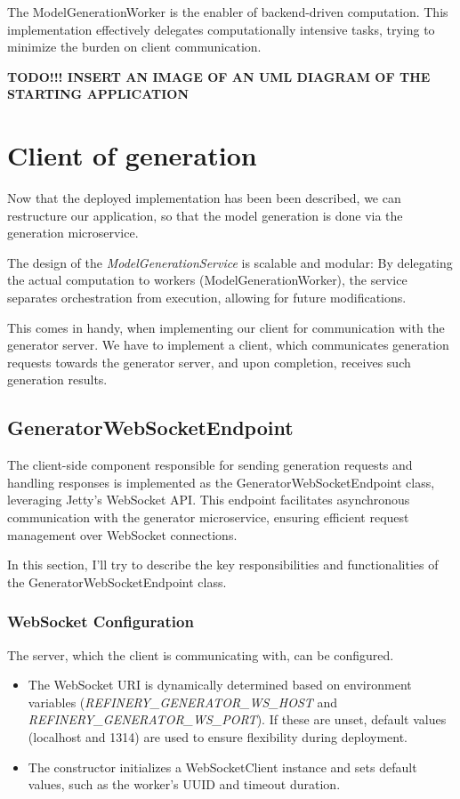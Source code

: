 			The ModelGenerationWorker is the enabler of backend-driven computation.
			This implementation effectively delegates computationally intensive tasks, trying to minimize 
			the burden on client communication.

		\textbf{TODO!!! INSERT AN IMAGE OF AN UML DIAGRAM OF THE STARTING APPLICATION}

	\section{Client of generation}
			Now that the deployed implementation has been been described, we can restructure our application, so that the 
			model generation is done via the generation microservice.

			The design of the \textit{ModelGenerationService} is scalable and modular:
			By delegating the actual computation to workers (ModelGenerationWorker), the service separates orchestration from execution, 
			allowing for future modifications. 
			
			This comes in handy, when implementing our client for communication with
			the generator server. We have to implement a client, which communicates generation requests towards the generator server,
			and upon completion, receives such generation results.

			\subsection{GeneratorWebSocketEndpoint}
			The client-side component responsible for sending generation requests and handling responses is implemented as the GeneratorWebSocketEndpoint class,
			leveraging Jetty's WebSocket API. This endpoint facilitates asynchronous communication with the generator microservice, 
			ensuring efficient request management over WebSocket connections. 

			In this section, I'll try to describe the key responsibilities and functionalities of the GeneratorWebSocketEndpoint class.
			\subsubsection{WebSocket Configuration} 
				The server, which the client is communicating with, can be configured.
				\begin{itemize}
					\item The WebSocket URI is dynamically determined based on environment variables (\textit{REFINERY\_GENERATOR\_WS\_HOST} 
					and \textit{REFINERY\_GENERATOR\_WS\_PORT}). If these are unset, default values (localhost and 1314) are used to ensure flexibility during deployment.
					\item The constructor initializes a WebSocketClient instance and sets default values, such as the worker's UUID and timeout duration.
				\end{itemize} 
